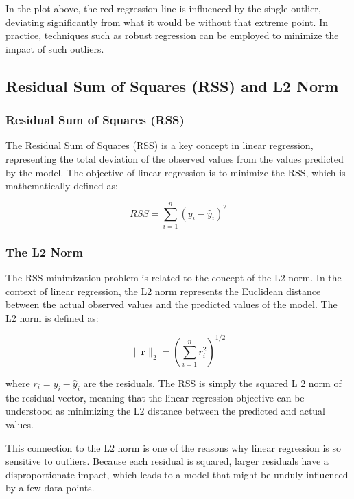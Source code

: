 \documentclass[
  12 pt,
  a4paper,
]{book}
\numberwithin{equation}{section}
\theoremstyle{plain}      %
\theoremstyle{definition} %
\theoremstyle{remark}     %
\theoremstyle{note}         %
\begin{document}
\newpage

In the plot above, the red regression line is influenced by the single
outlier, deviating significantly from what it would be without that
extreme point. In practice, techniques such as robust regression can be
employed to minimize the impact of such outliers.

\hypertarget{residual-sum-of-squares-rss-and-l2-norm}{%
\subsection{Residual Sum of Squares (RSS) and L2
Norm}\label{residual-sum-of-squares-rss-and-l2-norm}}

\hypertarget{residual-sum-of-squares-rss}{%
\subsubsection{Residual Sum of Squares
(RSS)}\label{residual-sum-of-squares-rss}}

The Residual Sum of Squares (RSS) is a key concept in linear regression,
representing the total deviation of the observed values from the values
predicted by the model. The objective of linear regression is to
minimize the RSS, which is mathematically defined as:

\[
R S S=\sum_{i=1}^n\left(y_i-\hat{y}_i\right)^2
\]

\hypertarget{the-l2-norm}{%
\subsubsection{The L2 Norm}\label{the-l2-norm}}

The RSS minimization problem is related to the concept of the L2 norm.
In the context of linear regression, the L2 norm represents the
Euclidean distance between the actual observed values and the predicted
values of the model. The L2 norm is defined as:

\[
\|\mathbf{r}\|_2=\left(\sum_{i=1}^n r_i^2\right)^{1 / 2}
\]

where \(r_i=y_i-\hat{y}_i\) are the residuals. The RSS is simply the
squared L 2 norm of the residual vector, meaning that the linear
regression objective can be understood as minimizing the L2 distance
between the predicted and actual values.

This connection to the L2 norm is one of the reasons why linear
regression is so sensitive to outliers. Because each residual is
squared, larger residuals have a disproportionate impact, which leads to
a model that might be unduly influenced by a few data points.
\end{document}
